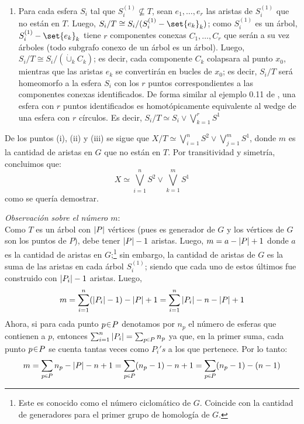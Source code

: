 \begin{sol}[Demostración]
\begin{enumerate}[label = (\roman*), leftmargin=1.2em]
\item Para cada esfera $S_i$ tal que $S^{(1)}_i \nsubseteq T$, sean $e_1,\dots,e_r$ las aristas de $S^{(1)}_i$ que no están en $T$. Luego, $S_i/T \cong S_i/(S^{(1)}_i-\set{e_k}_k)$; como $S^{(1)}_i$ es un árbol, $S^{(1)}_i-\set{e_k}_k$ tiene $r$ componentes conexas $C_1,\dots,C_r$ que serán a su vez árboles (todo subgrafo conexo de un árbol es un árbol). Luego, $S_i/T \cong S_i/(\dot\cup_kC_k)$; es decir, cada componente $C_k$ colapsara al punto $x_0$, mientras que las aristas $e_k$ se convertirán en bucles de $x_0$; es decir, $S_i/T$ será homeomorfo a la esfera $S_i$ con los $r$ puntos correspondientes a las componentes conexas identificados. De forma similar al ejemplo 0.11 de \cite[p. 13]{hatcher2002algebraic}, una esfera con $r$ puntos identificados es homotópicamente equivalente al wedge de una esfera con $r$ círculos. Es decir, $S_i/T \simeq S_i \vee \bigvee^r_{k=1}S^1$
\end{enumerate}


De los puntos (i), (ii) y (iii) se sigue que $X/T \simeq \bigvee_{i=1}^n S^2 \vee \bigvee_{j=1}^m S^1$, donde $m$ es la cantidad de aristas en $G$ que no están en $T$. Por transitividad y simetría, concluimos que:
\[
X \simeq \bigvee_{i=1}^n S^2 \vee \bigvee_{k=1}^m S^1
\]
como se quería demostrar.\vspace{1em}

\emph{Observación sobre el número $m$}:\\
Como $T$ es un árbol con $\abs{P}$ vértices (pues es generador de $G$ y los vértices de $G$ son los puntos de $P$), debe tener $\abs{P}-1$ aristas. Luego, $m = a - \abs{P} + 1$ donde $a$ es la cantidad de aristas en $G$;\footnote{Este es conocido como el número ciclomático de $G$. Coincide con la cantidad de generadores para el primer grupo de homología de $G$.} sin embargo, la cantidad de aristas de $G$ es la suma de las aristas en cada árbol $S^{(1)}_i$; siendo que cada uno de estos últimos fue construido con $\abs{P_i}-1$ aristas. Luego,
\[
m = \sum^n_{i=1}(\abs{P_i}-1) - \abs{P} + 1%
= \sum^n_{i=1}\abs{P_i} - n - \abs{P} + 1%
\]
Ahora, si para cada punto $p \en P$ denotamos por $n_p$ el número de esferas que contienen a $p$, entonces $\sum^n_{i=1}\abs{P_i} = \sum_{p \en P} n_p$ ya que, en la primer suma, cada punto $p \en P$ se cuenta tantas veces como $P_i's$ a los que pertenece. Por lo tanto:
\[
m = \sum_{p \en P} n_p - \abs{P} - n + 1 = \sum_{p \en P} (n_p - 1) - n + 1 = \sum_{p \en P} (n_p - 1) - (n-1)
\]
{

}
\end{sol}
